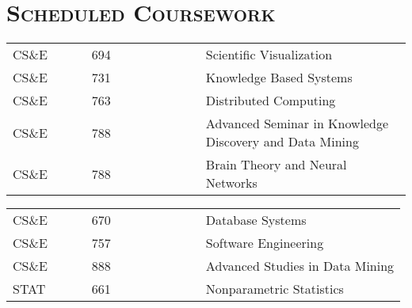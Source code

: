 \begin{resume}

\begin{formatb}
   \\
  \body\\
\end{formatb}

\section{\textsc{Scheduled Coursework}}

\begin{position}
\begin{tabular}{lllll}
CS\&E      & \ \ &  694  & \ \ &  Scientific Visualization \\
CS\&E      & \ \ &  731  & \ \ &  Knowledge Based Systems \\
CS\&E      & \ \ &  763  & \ \ &  Distributed Computing\\
CS\&E      & \ \ \ &  788 & \ \ \ \ \ \ \ \ \ \ \  &  Advanced Seminar in Knowledge Discovery and Data Mining\\
CS\&E      & \ \ &  788  & \ \ &  Brain Theory and Neural Networks \\
\end{tabular}
\end{position}


\begin{position}
\begin{tabular}{lllll}
CS\&E      & \ \ &  670  & \ \ &  Database Systems \\
CS\&E      & \ \ &  757  & \ \ &  Software Engineering \\
CS\&E      & \ \ &  888  & \ \ &  Advanced Studies in Data Mining \\
STAT      & \ \ \ &  661 & \ \ \ \ \ \ \ \ \ \ \  &  Nonparametric Statistics\\

\end{tabular}
\end{position}



\end{resume}
